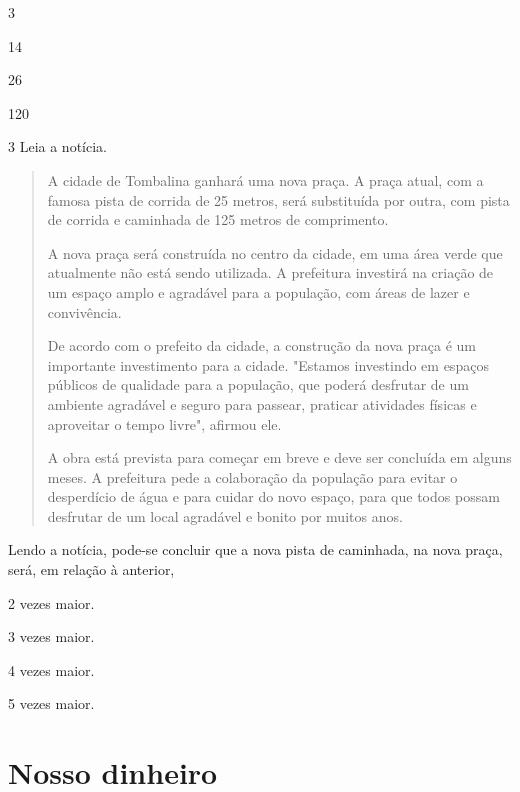 \begin{escolha}
\item
  3
\item
  14
\item
  26
\item
  120
\end{escolha}

\pagebreak
\num{3} Leia a notícia.

\begin{quote}
A cidade de Tombalina ganhará uma nova praça. A praça atual, com a famosa pista de corrida de 25 metros, será substituída por outra, com pista de corrida e caminhada de 125 metros de comprimento.

A nova praça será construída no centro da cidade, em uma área verde que atualmente não está sendo utilizada. A prefeitura investirá na criação de um espaço amplo e agradável para a população, com áreas de lazer e convivência.

De acordo com o prefeito da cidade, a construção da nova praça é um importante investimento para a cidade. "Estamos investindo em espaços públicos de qualidade para a população, que poderá desfrutar de um ambiente agradável e seguro para passear, praticar atividades físicas e aproveitar o tempo livre", afirmou ele.

A obra está prevista para começar em breve e deve ser concluída em alguns meses. A prefeitura pede a colaboração da população para evitar o desperdício de água e para cuidar do novo espaço, para que todos possam desfrutar de um local agradável e bonito por muitos anos.

\end{quote}

Lendo a notícia, pode-se concluir que a nova pista de caminhada, na nova praça, será, em relação à anterior,

\begin{escolha}
\item
  2 vezes maior.
\item
  3 vezes maior.
\item
  4 vezes maior.
\item
  5 vezes maior.
\end{escolha}

\chapter{Nosso dinheiro}

